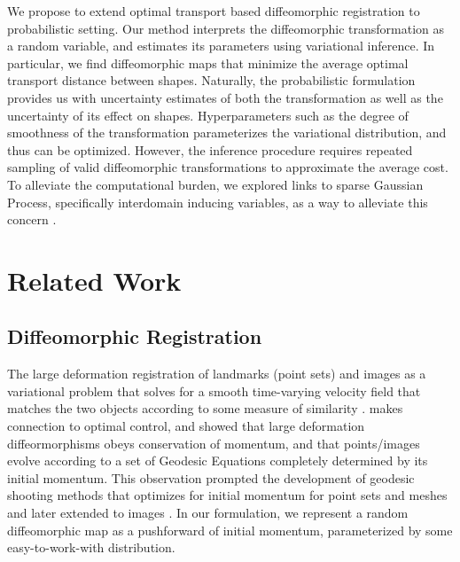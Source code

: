 \documentclass{6838publ}
\begin{document}
We propose to extend optimal transport based diffeomorphic registration to probabilistic setting. Our method interprets the diffeomorphic transformation as a random variable, and estimates its parameters using variational inference. In particular, we find diffeomorphic maps that minimize the average optimal transport distance between shapes. Naturally, the probabilistic formulation provides us with uncertainty estimates of both the transformation as well as the uncertainty of its effect on shapes. Hyperparameters such as the degree of smoothness of the transformation parameterizes the variational distribution, and thus can be optimized. However, the inference procedure requires repeated sampling of valid diffeomorphic transformations to approximate the average cost. To alleviate the computational burden, we explored links to sparse Gaussian Process, specifically interdomain inducing variables, as a way to alleviate this concern \cite{figueiras-vidalInterdomainGaussianProcesses2009a}.


\section{Related Work}

\subsection{Diffeomorphic Registration}

The large deformation registration of landmarks (point sets) and images as a variational problem that solves for a smooth time-varying velocity field that matches the two objects according to some measure of similarity \cite{joshiLandmarkMatchingLarge2000,begComputingLargeDeformation2005}. \cite{millerGeodesicShootingComputational2006,vialardDiffeomorphic3DImage2012} makes connection to optimal control, and showed that large deformation diffeormorphisms obeys conservation of momentum, and that points/images evolve according to a set of Geodesic Equations completely determined by its initial momentum. This observation prompted the development of geodesic shooting methods that optimizes for initial momentum for point sets and meshes \cite{vaillantStatisticsDiffeomorphismsTangent2004,allassonniereGeodesicShootingDiffeomorphic2005} and later extended to images \cite{vialardDiffeomorphic3DImage2012}. In our formulation, we represent a random diffeomorphic map as a pushforward of initial momentum, parameterized by some easy-to-work-with distribution.
\end{document}
